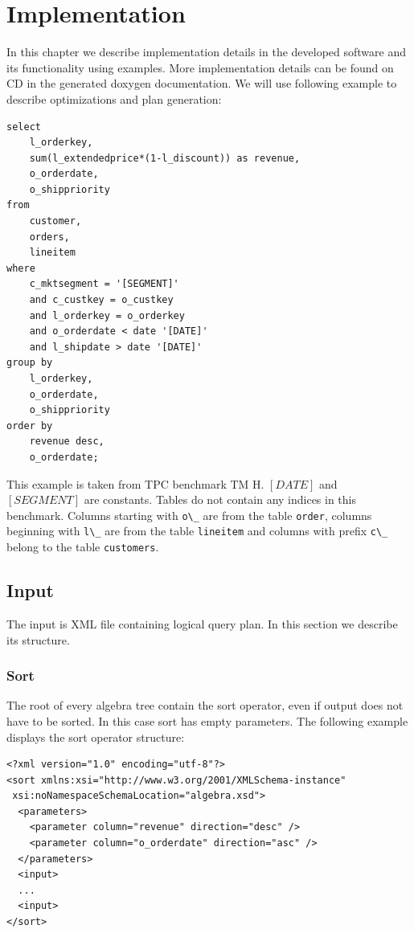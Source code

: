 \chapter{Implementation}
\label{implementation}
In this chapter we describe implementation details in the developed software and its functionality using examples. More implementation details can be found on CD in the generated doxygen\cite{doxygen} documentation. We will use following example to describe optimizations and plan generation:


\begin{verbatim}
select
    l_orderkey,
    sum(l_extendedprice*(1-l_discount)) as revenue,
    o_orderdate,
    o_shippriority
from
    customer,
    orders,
    lineitem
where
    c_mktsegment = '[SEGMENT]'
    and c_custkey = o_custkey
    and l_orderkey = o_orderkey
    and o_orderdate < date '[DATE]'
    and l_shipdate > date '[DATE]'
group by
    l_orderkey,
    o_orderdate,
    o_shippriority
order by
    revenue desc,
    o_orderdate;
\end{verbatim}

This example is taken from TPC benchmark TM H\cite{benchmark}. $[DATE]$ and $[SEGMENT]$ are constants. Tables do not contain any indices in this benchmark. Columns starting with \verb|o\_| are from the table \verb|order|, columns beginning with \verb|l\_| are from the table \verb|lineitem| and columns with prefix \verb|c\_| belong to the table \verb|customers|.



\section{Input}

The input is XML file containing logical query plan. In this section we describe its structure. 

\subsection{Sort}

The root of every algebra tree contain the sort operator, even if output does not have to be sorted. In this case sort has empty parameters. The following example displays the sort operator structure:


\begin{lstlisting}
<?xml version="1.0" encoding="utf-8"?>
<sort xmlns:xsi="http://www.w3.org/2001/XMLSchema-instance"
 xsi:noNamespaceSchemaLocation="algebra.xsd">
  <parameters>
    <parameter column="revenue" direction="desc" />
    <parameter column="o_orderdate" direction="asc" />
  </parameters>
  <input>
  ...
  <input>
</sort>
\end{lstlisting}

